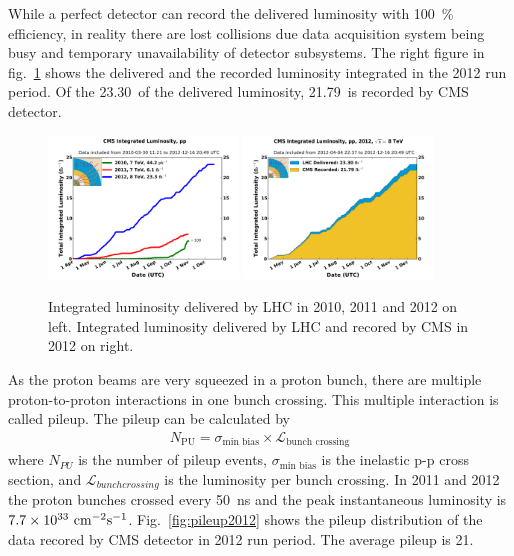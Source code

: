 While a perfect detector can record the delivered luminosity 
with 100~\% efficiency, in reality there are lost collisions 
due data acquisition system being busy and temporary unavailability 
of detector subsystems.  
The right figure in fig.~\ref{fig:intlumi} shows the delivered and the recorded luminosity 
integrated in the 2012 run period. Of the 23.30~\ifb of the delivered luminosity,  
21.79~\ifb is recorded by CMS detector.  

%
\begin{figure}[ht!] 
\centering 
\includegraphics[width=0.45\textwidth]{figures/int_lumi_cumulative_pp_2.pdf}
\includegraphics[width=0.45\textwidth]{figures/int_lumi_per_day_cumulative_pp_2012.pdf}
\caption{Integrated luminosity delivered by LHC in 2010, 2011 and 2012 on left. 
Integrated luminosity delivered by LHC and recored by CMS in 2012 on right.} 
\label{fig:intlumi} 
\end{figure} 

As the proton beams are very squeezed in a proton bunch, there are multiple 
proton-to-proton interactions in one bunch crossing. This multiple interaction 
is called pileup. The pileup can be calculated by 
\begin{eqnarray} 
N_\textrm{{PU}} 
= 
\sigma_{\textrm{min bias}} \times \mathcal{L}_{\textrm{bunch crossing}} 
\end{eqnarray} 
where $N_{PU}$ is the number of pileup events, 
$\sigma_{\textrm{min bias}}$ is the inelastic p-p cross section, 
and $\mathcal{L}_{bunch crossing}$ is the luminosity per bunch crossing.
In 2011 and 2012 the proton bunches crossed every 50~ns 
and the peak instantaneous luminosity is $7.7\times 10^{33} ~\mathrm{cm}^{-2}\textrm{s}^{-1}$. 
Fig.~\ref{fig:pileup2012} shows the pileup distribution 
of the data recored by CMS detector in 2012 run period. 
The average pileup is 21. 


